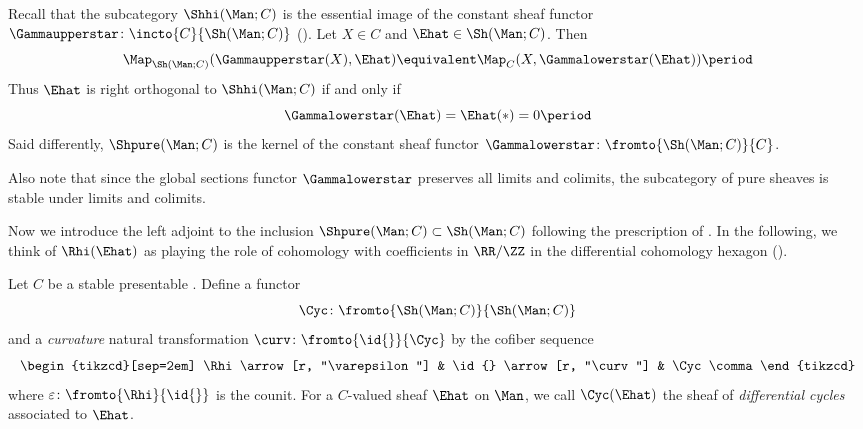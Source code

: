 \begin{observation}
	Recall that the subcategory $ \Shhi(\Man;C) $ is the essential image of the constant sheaf functor $ \Gammaupperstar \colon \incto{C}{\Sh(\Man;C)} $ ().
	Let $ X \in C $ and $ \Ehat \in \Sh(\Man;C) $.
	Then 
	\begin{equation*}
		\Map_{\Sh(\Man;C)}(\Gammaupperstar(X),\Ehat) \equivalent \Map_C(X,\Gammalowerstar(\Ehat)) \period
	\end{equation*}
	Thus $ \Ehat $ is right orthogonal to $ \Shhi(\Man;C) $ if and only if 
	\begin{equation*}
		\Gammalowerstar(\Ehat) = \Ehat(*) = 0 \period
	\end{equation*}
	Said differently, $ \Shpure(\Man;C) $ is the kernel of the constant sheaf functor $ \Gammalowerstar \colon \fromto{\Sh(\Man;C)}{C} $.

	Also note that since the global sections functor $ \Gammalowerstar $ preserves all limits and colimits, the subcategory of pure sheaves is stable under limits and colimits.
\end{observation}

Now we introduce the left adjoint to the inclusion $ \Shpure(\Man;C) \subset \Sh(\Man;C) $ following the prescription of .
In the following, we think of $ \Rhi(\Ehat) $ as playing the role of cohomology with coefficients in $ \RR/\ZZ $ in the differential cohomology hexagon ().

\begin{definition}\label{differential_cycles}
	Let $ C $ be a stable presentable \category.
	Define a functor
	\begin{equation*}
		\Cyc \colon \fromto{\Sh(\Man;C)}{\Sh(\Man;C)}
	\end{equation*}
	and a \textit{curvature} natural transformation $ \curv \colon \fromto{\id{}}{\Cyc} $ by the cofiber sequence
	\begin{equation*}
		\begin{tikzcd}[sep=2em]
			\Rhi \arrow[r, "\varepsilon"] & \id{} \arrow[r, "\curv"] & \Cyc \comma
		\end{tikzcd}
	\end{equation*} 
	where $ \varepsilon \colon \fromto{\Rhi}{\id{}} $ is the counit.
	For a $ C $-valued sheaf $ \Ehat $ on $ \Man $, we call $ \Cyc(\Ehat) $ the sheaf of \textit{differential cycles} associated to $ \Ehat $.
\end{definition}


